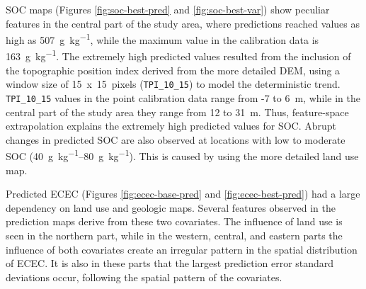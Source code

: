 SOC maps (Figures \ref{fig:soc-best-pred} and \ref{fig:soc-best-var}) show peculiar features in the central 
part of the study area, where predictions reached values as high as \SI{507}{\gram\per\kilo\gram}, while 
the maximum value in the calibration data is \SI{163}{\gram\per\kilo\gram}. The extremely high predicted 
values resulted from the inclusion of the topographic position index derived from the more detailed DEM, using 
a window size of 15~x~15~pixels (\texttt{TPI\_10\_15}) to model the deterministic trend. \texttt{TPI\_10\_15} 
values in the point calibration data range from -7 to 6~m, while in the central part of the study area they 
range from 12 to 31~m. Thus, feature-space extrapolation explains the extremely high predicted values for SOC. 
Abrupt changes in predicted SOC are also observed at locations with low to moderate SOC 
(\SIrange{40}{80}{\gram\per\kilo\gram}). This is caused by using the more detailed land use map.

Predicted ECEC (Figures \ref{fig:ecec-base-pred} and \ref{fig:ecec-best-pred}) had a large dependency on land 
use and geologic maps. Several features observed in the prediction maps derive from these two covariates. The 
influence of land use is seen in the northern part, while in the western, central, and eastern parts the 
influence of both covariates create an irregular pattern in the spatial distribution of ECEC. It is also in 
these parts that the largest prediction error standard deviations occur, following the spatial pattern of the 
covariates.

